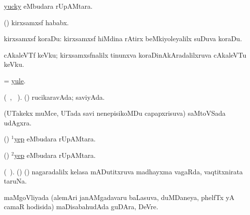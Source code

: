 \bentry
{} 
\gl{\gu} 
\bmng
\hyperlink{yucky}{yucky}  eMbudara rUpAMtara.
\emng
\eentry

\bentry
{} 
\gl{\nA} 
\bmng
(\pArxparx)  kirxsamxsf hababx.
\emng
\eentry

\bentry
{} 
\gl{\nA} 
\bmng
kirxsamxsf koraDu: 
\banum
{}  kirxsamxsf hiMdina rAtirx beMkiyoleyalilx suDuva koraDu. 

 cAkaleVTf keVku; kirxsamxsfnalilx tinunxva koraDinAkAradalilxruva  cAkaleVTu keVku.
\eanum
\emng 
\eentry

\bentry
{} 
\gl{\nA} 
\bmng
= \hyperlink{yule}{yule}.
\emng
\eentry

\bentry
{} 
\gl{\gu} 
\bmng
(\tara\ , \tama\ ).
(\AmA) rucikaravAda; saviyAda.
\emng
\eentry

\bentry
{} 
\gl{\BAavayx} 
\bmng
(UTakekx muMce, UTada  savi nenepisikoMDu capapxrisuva) saMtoVSada udAgxra.
\emng
\eentry

\bentry
{} 
\gl{\kirxvi} 
\bmng
(\ame) \hyperlink{yep(1)}{$^1$yep} eMbudara rUpAMtara.
\emng
\eentry

\bentry
{} 
\gl{\nA}
\bmng
(\ame) \hyperlink{yep(2)}{$^2$yep} eMbudara rUpAMtara.
\emng
\eentry

\bentry
{} 
\gl{\nA} 
\bmng
(\bava\ ). 
(\AmA) (\hiV) nagaradalilx kelasa mADutitxruva madhayxma vagaRda, vaqtitxnirata taruNa.
\emng
\eentry

\bentry
{} 
\gl{\nA} 
\bmng
maMgoVliyada (alemAri janAMgadavaru baLasuva, duMDaneya, phelfTx yA camaR hodisida) maDisabahudAda guDAra, DeVre.
\emng 
\eentry

\bentry
{}
\gl{\saMkiSx} 
\bmng
{}
\emng
\eentry


%

